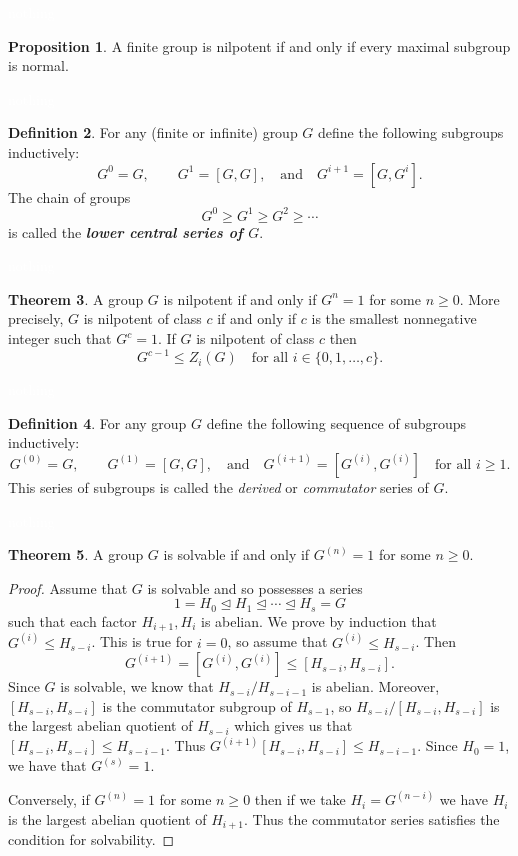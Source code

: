 \documentclass{article}
\theoremstyle{definition}
\newtheorem{thm}{Theorem}[section]
\newtheorem{prop}[thm]{Proposition}
\newtheorem{defn}[thm]{Definition}
\newcommand{\nl}{\textcolor{white}{nothing}}
\begin{document}
\nl

\begin{prop}
A finite group is nilpotent if and only if every maximal subgroup is normal.
\end{prop}

\nl

\begin{defn}
For any (finite or infinite) group $G$ define the following subgroups inductively:
\[G^0 = G,\qquad G^1 = [G,G],\quad\text{and}\quad G^{i+1} = [G,G^i].\]
The chain of groups 
\[G^0\geq G^1\geq G^2\geq\cdots\]
is called the \textbf{\textit{lower central series of $G$}}.
\end{defn}

\nl

\begin{thm}
A group $G$ is nilpotent if and only if $G^n = 1$ for some $n\geq 0$. More precisely, $G$ is nilpotent of class $c$ if and only if $c$ is the smallest nonnegative integer such that $G^c = 1$. If $G$ is nilpotent of class $c$ then
\[G^{c-1} \leq Z_i(G)\quad\text{for all } i\in \{0,1,\ldots,c\}.\]
\end{thm}

\nl

\begin{defn}
For any group $G$ define the following sequence of subgroups inductively:
\[G^{(0)} = G,\qquad G^{(1)} = [G,G],\quad\text{and}\quad G^{(i+1)} = [G^{(i)},G^{(i)}]\quad\text{for all }i\geq 1.\]
This series of subgroups is called the \textit{derived} or \textit{commutator} series of $G$.
\end{defn}

\nl

\begin{thm}
A group $G$ is solvable if and only if $G^{(n)} = 1$ for some $n\geq 0$.
\end{thm}

\begin{proof}
Assume that $G$ is solvable and so possesses a series 
\[1 = H_0\unlhd H_1\unlhd \cdots\unlhd H_s = G\]
such that each factor $H_{i+1}, H_i$ is abelian. We prove by induction that $G^{(i)}\leq H_{s-i}$. This is true for $i = 0$, so assume that $G^{(i)}\leq H_{s-i}$. Then
\[G^{(i+1)} = [G^{(i)},G^{(i)}] \leq [H_{s-i},H_{s-i}].\]
Since $G$ is solvable, we know that $H_{s-i}/H_{s-i-1}$ is abelian. Moreover, $[H_{s-i},H_{s-i}]$ is the commutator subgroup of $H_{s-1}$, so $H_{s-i}/[H_{s-i},H_{s-i}]$ is the largest abelian quotient of $H_{s-i}$ which gives us that $[H_{s-i},H_{s-i}]\leq H_{s-i-1}$. Thus $G^{(i+1)} [H_{s-i},H_{s-i}]\leq H_{s-i-1}$. Since $H_0 = 1$, we have that $G^{(s)} = 1$.

Conversely, if $G^{(n)} = 1$ for some $n\geq 0$ then if we take $H_i = G^{(n - i)}$ we have $H_i$ is the largest abelian quotient of $H_{i+1}$. Thus the commutator series satisfies the condition for solvability.
\end{proof}
\end{document}
